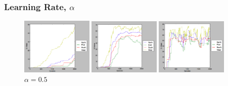 \documentclass{beamer}
\begin{document}
  \begin{frame}
  	\frametitle{Learning Rate, $\alpha$}
	\begin{figure}
		\begin{minipage}{.32\textwidth}
			\includegraphics[width=3.4cm]{25a03g9}
				\caption{$\alpha = 0.03$}
		\end{minipage}
		\begin{minipage}{0.32\textwidth}
			\includegraphics[width=3.4cm]{25a1g9}
				\caption{$\alpha = 0.1$}
		\end{minipage}
		\begin{minipage}{0.32\textwidth}
			\includegraphics[width=3.4cm]{25a5g9}
				\caption{$\alpha = 0.5$}
		\end{minipage}
	\end{figure}
  \end{frame}
  
\end{document}
